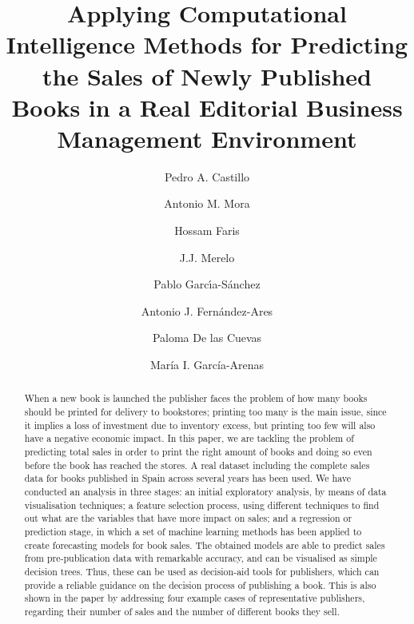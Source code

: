\documentclass[a4paper,10pt,twocolumn,preprint,3p]{elsarticle}
\begin{document}
\begin{frontmatter}

\title{Applying Computational Intelligence Methods for Predicting the Sales of Newly Published Books in a Real Editorial Business Management Environment} 




\author[ugr]{Pedro A. Castillo}
\author[ugr]{Antonio M. Mora}
\author[abd]{Hossam Faris}
\author[ugr]{J.J. Merelo}
\author[ugr]{Pablo Garc\'{\i}a-S\'anchez}
\author[ugr]{Antonio J. Fern\'andez-Ares}
\author[ugr]{Paloma De las Cuevas}
\author[ugr]{Mar\'ia I. Garc\'ia-Arenas}


\address[ugr]{Department of Computer Architecture and Computer Technology, ETSIIT and CITIC \\
University of Granada, Granada, Spain. Tel: +34958241778. Fax: +34958248993}
\address[abd]{Business Information Technology Department, King Abdullah II School for Information Technology \\
The University of Jordan, Amman, Jordan}

\begin{abstract}
When a new book is launched the publisher faces the problem of how
many books should be printed for delivery to bookstores; printing too
many is the main issue, since it implies a loss of investment due to
inventory excess, but printing too few will also have a negative economic impact. 
In this paper, we are tackling the problem of predicting total sales 
in order to print the right amount of books and doing so even before the book 
has reached the stores. A real dataset including the complete sales data for 
books published in Spain across several years has been used.
We have conducted an analysis in three stages: an initial exploratory analysis, 
by means of data visualisation techniques; a feature selection process, using 
different techniques to find out what are the variables that have more impact on sales; 
and a regression or prediction stage, in which a set of machine learning methods 
has been applied to create forecasting models for book sales. 
The obtained models are able to predict sales from pre-publication data with
remarkable accuracy, and can be visualised as simple decision trees. 
Thus, these can be used as decision-aid tools for publishers, which can provide 
a reliable guidance on the decision process of publishing a book. 
This is also shown in the paper by addressing four example cases of representative 
publishers, regarding their number of sales and the number of different books they sell.
\end{abstract}


\end{frontmatter}
\end{document}
